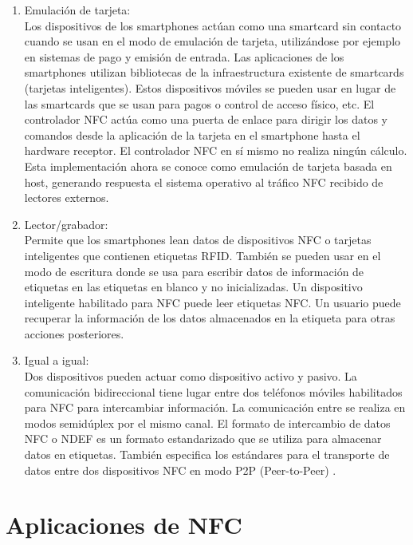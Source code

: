 \documentclass[12pt,a4paper,onecolumn,oneside]{report}
\begin{document}
\begin{enumerate}

\item Emulación de tarjeta:\\
Los dispositivos de los smartphones actúan como una smartcard sin contacto cuando se usan en el modo de emulación de tarjeta,  utilizándose por ejemplo en sistemas de pago y emisión de entrada. Las aplicaciones de los smartphones utilizan bibliotecas de la infraestructura existente de smartcards (tarjetas inteligentes). Estos dispositivos móviles se pueden usar en lugar de las smartcards que se usan para pagos o control de acceso físico, etc. El controlador NFC actúa como una puerta de enlace para dirigir los datos y comandos desde la aplicación de la tarjeta en el smartphone hasta el hardware receptor. El controlador NFC en sí mismo no realiza ningún cálculo. Esta implementación ahora se conoce como emulación de tarjeta basada en host, generando respuesta el sistema operativo al tráfico NFC recibido de lectores externos.

\item Lector/grabador:\\
Permite que los smartphones lean datos de dispositivos NFC o tarjetas inteligentes que contienen etiquetas RFID. También se pueden usar en el modo de escritura donde se usa para escribir datos de información de etiquetas en las etiquetas en blanco y no inicializadas. Un dispositivo inteligente habilitado para NFC puede leer etiquetas NFC. Un usuario puede recuperar la información de los datos almacenados en la etiqueta para otras acciones posteriores.

\item Igual a igual:\\
Dos dispositivos pueden actuar como dispositivo activo y pasivo. La comunicación bidireccional tiene lugar entre dos teléfonos móviles habilitados para NFC para intercambiar información. La comunicación entre se realiza en modos semidúplex por el mismo canal. El formato de intercambio de datos NFC o NDEF \cite{cinco} es un formato estandarizado que se utiliza para almacenar datos en etiquetas. También especifica los estándares para el transporte de datos entre dos dispositivos NFC en modo P2P (Peer-to-Peer) \cite{seis}. 

\end{enumerate}

\section{Aplicaciones de NFC}
\end{document}

